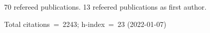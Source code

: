 70 refereed publications. 13 refeered publications as first author.

Total citations~=~2243; h-index~=~23 (2022-01-07)